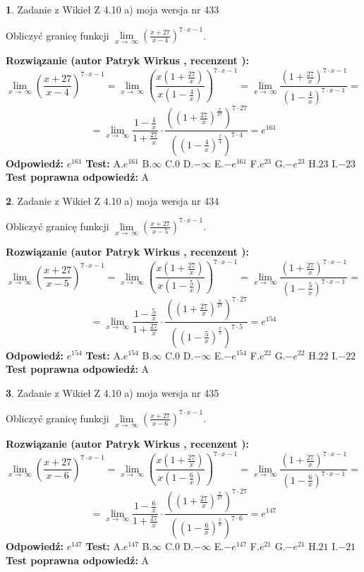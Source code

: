 \documentclass[12pt, a4paper]{article}
\theoremstyle{definition} %
\newtheorem{zad}{}
\newcommand{\zadStart}[1]{\begin{zad}#1\newline}
\newcommand{\zadStop}{\end{zad}}
\newcommand{\rozwStart}[2]{\noindent \textbf{Rozwiązanie (autor #1 , recenzent #2): }\newline}
\newcommand{\rozwStop}{\newline}
\newcommand{\odpStart}{\noindent \textbf{Odpowiedź:}\newline}
\newcommand{\odpStop}{\newline}
\newcommand{\testStart}{\noindent \textbf{Test:}\newline}
\newcommand{\testStop}{\newline}
\newcommand{\kluczStart}{\noindent \textbf{Test poprawna odpowiedź:}\newline}
\newcommand{\kluczStop}{\newline}
\begin{document}
\zadStart{Zadanie z Wikieł Z 4.10 a) moja wersja nr 433}

Obliczyć granicę funkcji  $\lim\limits_{x\to\ \infty}(\frac{x+27}{x-4})^{7\cdot x-1}$.
\zadStop
\rozwStart{Patryk Wirkus}{}
$$\lim\limits_{x\to\ \infty}(\frac{x+27}{x-4})^{7\cdot x-1} = \lim\limits_{x\to\ \infty}(\frac{x(1+\frac{27}{x})}{x(1-\frac{4}{x})})^{7\cdot x-1}=\lim\limits_{x\to\ \infty}\frac{(1+\frac{27}{x})^{7\cdot x-1}}{(1-\frac{4}{x})^{7\cdot x-1}}=$$
$$=\lim\limits_{x\to\ \infty}\frac{1-\frac{4}{x}}{1+\frac{27}{x}}\cdot\frac{((1+\frac{27}{x})^{\frac{x}{27}})^{7\cdot27}}{((1-\frac{4}{x})^{\frac{x}{4}})^{7\cdot4}}=e^{161}$$
\rozwStop
\odpStart
$e^{161}$
\odpStop
\testStart
A.$e^{161}$ B.$\infty$ C.$0$ D.$-\infty$ E.$-e^{161}$
F.$e^{23}$ G.$-e^{23}$
H.$23$
I.$-23$
\testStop
\kluczStart
A
\kluczStop



\zadStart{Zadanie z Wikieł Z 4.10 a) moja wersja nr 434}

Obliczyć granicę funkcji  $\lim\limits_{x\to\ \infty}(\frac{x+27}{x-5})^{7\cdot x-1}$.
\zadStop
\rozwStart{Patryk Wirkus}{}
$$\lim\limits_{x\to\ \infty}(\frac{x+27}{x-5})^{7\cdot x-1} = \lim\limits_{x\to\ \infty}(\frac{x(1+\frac{27}{x})}{x(1-\frac{5}{x})})^{7\cdot x-1}=\lim\limits_{x\to\ \infty}\frac{(1+\frac{27}{x})^{7\cdot x-1}}{(1-\frac{5}{x})^{7\cdot x-1}}=$$
$$=\lim\limits_{x\to\ \infty}\frac{1-\frac{5}{x}}{1+\frac{27}{x}}\cdot\frac{((1+\frac{27}{x})^{\frac{x}{27}})^{7\cdot27}}{((1-\frac{5}{x})^{\frac{x}{5}})^{7\cdot5}}=e^{154}$$
\rozwStop
\odpStart
$e^{154}$
\odpStop
\testStart
A.$e^{154}$ B.$\infty$ C.$0$ D.$-\infty$ E.$-e^{154}$
F.$e^{22}$ G.$-e^{22}$
H.$22$
I.$-22$
\testStop
\kluczStart
A
\kluczStop



\zadStart{Zadanie z Wikieł Z 4.10 a) moja wersja nr 435}

Obliczyć granicę funkcji  $\lim\limits_{x\to\ \infty}(\frac{x+27}{x-6})^{7\cdot x-1}$.
\zadStop
\rozwStart{Patryk Wirkus}{}
$$\lim\limits_{x\to\ \infty}(\frac{x+27}{x-6})^{7\cdot x-1} = \lim\limits_{x\to\ \infty}(\frac{x(1+\frac{27}{x})}{x(1-\frac{6}{x})})^{7\cdot x-1}=\lim\limits_{x\to\ \infty}\frac{(1+\frac{27}{x})^{7\cdot x-1}}{(1-\frac{6}{x})^{7\cdot x-1}}=$$
$$=\lim\limits_{x\to\ \infty}\frac{1-\frac{6}{x}}{1+\frac{27}{x}}\cdot\frac{((1+\frac{27}{x})^{\frac{x}{27}})^{7\cdot27}}{((1-\frac{6}{x})^{\frac{x}{6}})^{7\cdot6}}=e^{147}$$
\rozwStop
\odpStart
$e^{147}$
\odpStop
\testStart
A.$e^{147}$ B.$\infty$ C.$0$ D.$-\infty$ E.$-e^{147}$
F.$e^{21}$ G.$-e^{21}$
H.$21$
I.$-21$
\testStop
\kluczStart
A
\kluczStop
\end{document}

